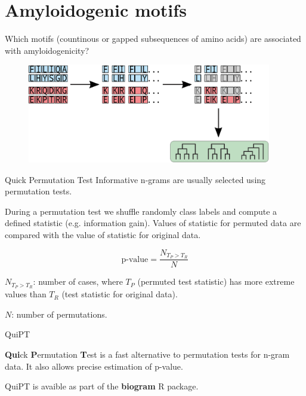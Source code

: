 \documentclass{beamer}\usepackage[]{graphicx}\usepackage[]{color}
\begin{document}
  
\section{Amyloidogenic motifs}

\begin{frame}
  Which motifs (countinous or gapped subsequences of amino acids) are associated with amyloidogenicity?
  \end{frame}


    \begin{frame}
\begin{figure} 
\includegraphics[width=0.95\textwidth]{static_figure/ngram1.eps}
\end{figure}
  \end{frame}
  

\begin{frame}{Quick Permutation Test}
  Informative n-grams are usually selected using permutation tests.

During a permutation test we shuffle randomly class labels and compute a defined statistic (e.g. information gain). Values of statistic for permuted data are compared with the value of statistic for original data.

$$
\textrm{p-value} = \frac{N_{T_P > T_R}}{N} $$

$N_{T_P > T_R}$: number of cases, where $T_P$ (permuted test statistic) has more extreme values than $T_R$ (test statistic for original data).

$N$: number of permutations.
  \end{frame}
  
\begin{frame}{QuiPT}  
  
  \textbf{Qui}ck \textbf{P}ermutation \textbf{T}est is a fast alternative to permutation tests for n-gram data. It also allows precise estimation of p-value.

QuiPT is avaible as part of the \textbf{biogram} R package.
\end{frame}
  
\end{document}
